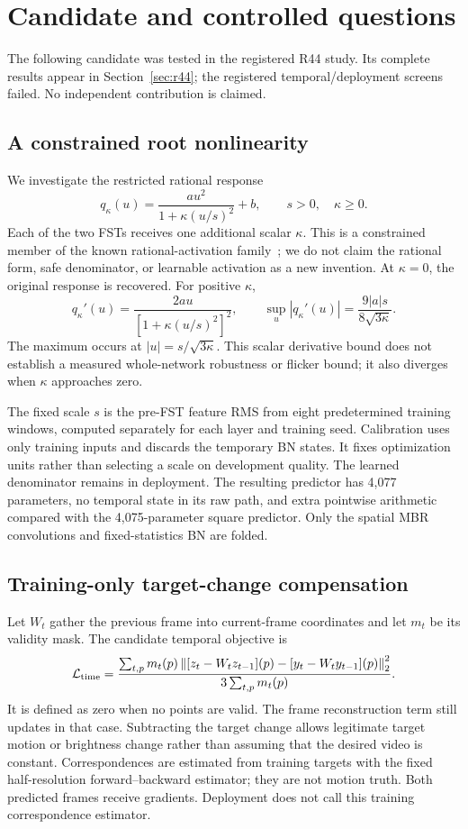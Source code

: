 \section{Candidate and controlled questions}
\label{sec:candidate}
The following candidate was tested in the registered R44 study.
Its complete results appear in Section~\ref{sec:r44}; the registered
temporal/deployment screens failed. No independent contribution is claimed.

\subsection{A constrained root nonlinearity}
We investigate the restricted rational response
\[
 q_\kappa(u)=\frac{a u^2}{1+\kappa(u/s)^2}+b,
 \qquad s>0,\quad \kappa\geq 0 .
\]
Each of the two FSTs receives one additional scalar $\kappa$. This is a
constrained member of the known rational-activation family~\cite{pau};
we do not claim the rational form, safe denominator, or learnable activation
as a new invention. At $\kappa=0$, the original response is recovered.
For positive $\kappa$,
\[
 q_\kappa'(u)=\frac{2au}{[1+\kappa(u/s)^2]^2},
 \qquad
 \sup_u|q_\kappa'(u)|
 =\frac{9|a|s}{8\sqrt{3\kappa}}.
\]
The maximum occurs at $|u|=s/\sqrt{3\kappa}$. This scalar derivative bound
does not establish a measured whole-network robustness or flicker bound;
it also diverges when $\kappa$ approaches zero.

The fixed scale $s$ is the pre-FST feature RMS from eight predetermined
training windows, computed separately for each layer and training seed.
Calibration uses only training inputs and discards the temporary BN states.
It fixes optimization units rather than selecting a scale on development
quality. The learned denominator remains in deployment. The resulting
predictor has 4,077 parameters, no temporal state in its raw path, and extra
pointwise arithmetic compared with the 4,075-parameter square predictor.
Only the spatial MBR convolutions and fixed-statistics BN are folded.

\subsection{Training-only target-change compensation}
Let $W_t$ gather the previous frame into current-frame coordinates and let
$m_t$ be its validity mask. The candidate temporal objective is
\[
 \mathcal L_{\rm time} =
 \frac{\sum_{t,p}m_t(p)
 \left\|[z_t-W_tz_{t-1}](p)
       -[y_t-W_ty_{t-1}](p)\right\|_2^2}
 {3\sum_{t,p}m_t(p)} .
\]
It is defined as zero when no points are valid. The frame reconstruction
term still updates in that case. Subtracting the target change allows
legitimate target motion or brightness change rather than assuming that
the desired video is constant. Correspondences are estimated from training
targets with the fixed half-resolution forward--backward estimator; they
are not motion truth. Both predicted frames receive gradients. Deployment
does not call this training correspondence estimator.

